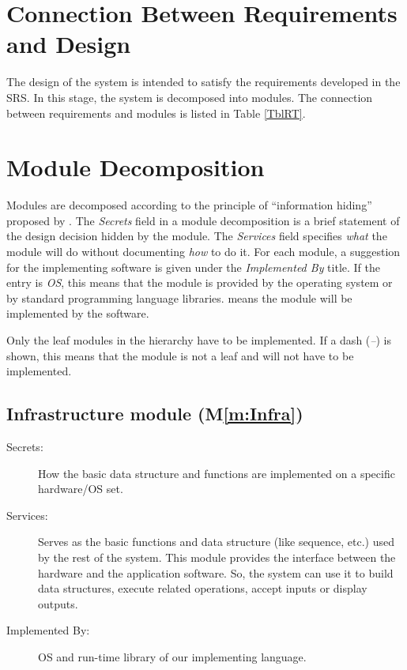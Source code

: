 \documentclass[12pt, titlepage]{article}
\newcommand{\mref}[1]{M\ref{m:#1}}
\begin{document}
\section{Connection Between Requirements and Design} \label{SecConnection}

The design of the system is intended to satisfy the requirements developed in
the SRS. In this stage, the system is decomposed into modules. The connection
between requirements and modules is listed in Table \ref{TblRT}.

\section{Module Decomposition} \label{SecMD}

Modules are decomposed according to the principle of ``information hiding''
proposed by \citet{ParnasEtAl1984}. The \emph{Secrets} field in a module
decomposition is a brief statement of the design decision hidden by the
module. The \emph{Services} field specifies \emph{what} the module will do
without documenting \emph{how} to do it. For each module, a suggestion for the
implementing software is given under the \emph{Implemented By} title. If the
entry is \emph{OS}, this means that the module is provided by the operating
system or by standard programming language libraries.  \emph{\progname{}} means the
module will be implemented by the \progname{} software.

Only the leaf modules in the hierarchy have to be implemented. If a dash
(\emph{--}) is shown, this means that the module is not a leaf and will not have
to be implemented.

\subsection{Infrastructure module (\mref{Infra})}

\begin{description}
\item[Secrets:]How the basic data structure   and functions are
  implemented on a specific hardware/OS set.
\item[Services:]Serves as the basic functions and data structure (like sequence,
  etc.) used by the rest of the system. This module provides the interface
  between the hardware and the application software. So, the system can use it
  to build data structures, execute related operations, accept inputs or display
  outputs.
\item[Implemented By:] OS and run-time library of our implementing language.
\end{description}
\end{document}
